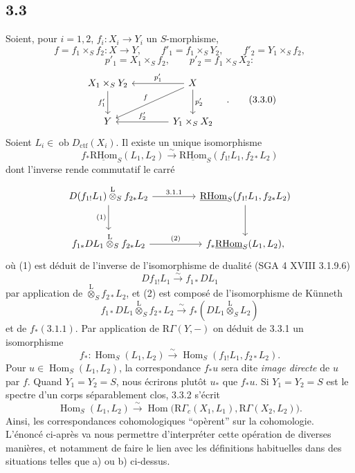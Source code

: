\documentclass[11pt]{article}
\DeclareMathOperator{\Hom}{Hom}
\newcommand{\R}{\mathrm{R}}\newcommand{\RHomCore}{\mathrm{RHom}}
\newcommand{\ob}{\operatorname{ob}}
\providecommand{\RHom}{\RHomCore}
\providecommand{\uRHom}{\underline{\RHom}}
\providecommand{\Dctf}{D_{\mathrm{ctf}}}
\providecommand{\Dctf}{D_{\mathrm{ctf}}}
\providecommand{\RHom}{\RHomCore}
\providecommand{\Hom}{\operatorname{Hom}}
\providecommand{\ob}{\operatorname{ob}}
\providecommand{\RHom}{\R\mathcal{H}om}
\providecommand{\R}{\mathrm R}
\providecommand{\RHom}{\RHomCore}
\providecommand{\Hom}{\operatorname{Hom}}
\begin{document}
\subsection*{3.3}
Soient, pour $i=1,2$, $f_i:X_i\to Y_i$ un $S$-morphisme,
\[
f=f_1\times_S f_2:X\to Y,
\qquad
f'_1=f_1\times_S Y_2,
\qquad
f'_2=Y_1\times_S f_2,
\]
\[
p'_1=X_1\times_S f_2,
\qquad
p'_2=f_1\times_S X_2:
\]
\begin{equation}
\begin{tikzcd}[column sep=3.8em,row sep=2.4em]
X_1\times_S Y_2 \arrow[d,"f'_1"'] & X \arrow[l,"p'_1"'] \arrow[dl,"f"'] \arrow[d,"p'_2"] \\
Y & Y_1\times_S X_2 \arrow[l,"f'_2"']
\end{tikzcd}\quad .
\tag{3.3.0}
\end{equation}
Soient $L_i\in\ob\Dctf(X_i)$. Il existe un unique isomorphisme
\begin{equation}
f_*\uRHom_S(L_1,L_2)
\xrightarrow{\sim}
\uRHom_S(f_{1!}L_1,f_{2*}L_2)
\tag{3.3.1}
\end{equation}
dont l'inverse rende commutatif le carré
\[
\begin{tikzcd}[column sep=4.5em,row sep=2.6em]
D(f_{1!}L_1)\overset{\mathrm{L}}{\otimes}_S f_{2*}L_2
  \arrow[r,"3.1.1"] \arrow[d,"(1)"']
& \uRHom_S(f_{1!}L_1,f_{2*}L_2) \arrow[d] \\
f_{1*}DL_1\overset{\mathrm{L}}{\otimes}_S f_{2*}L_2
  \arrow[r,"(2)"]
& f_*\uRHom_S(L_1,L_2),
\end{tikzcd}
\]
où (1) est
déduit de l'inverse de l'isomorphisme de dualité (SGA 4 XVIII 3.1.9.6)
\[
Df_{1!}L_1\xrightarrow{\sim}f_{1*}DL_1
\]
par application de $\overset{\mathrm{L}}{\otimes}_S f_{2*}L_2$, et (2) est composé de l'isomorphisme de Künneth
\[
f_{1*}DL_1\overset{\mathrm{L}}{\otimes}_S f_{2*}L_2
\xrightarrow{\sim}
f_*(DL_1\overset{\mathrm{L}}{\otimes}_S L_2)
\]
et de $f_*(3.1.1)$. Par application de $\R\Gamma(Y,-)$ on déduit de 3.3.1 un isomorphisme
\begin{equation}
f_*:\Hom_S(L_1,L_2)
\xrightarrow{\sim}
\Hom_S(f_{1!}L_1,f_{2*}L_2).
\tag{3.3.2}
\end{equation}
Pour $u\in\Hom_S(L_1,L_2)$, la correspondance $f_*u$ sera dite \emph{image directe} de $u$ par $f$. Quand $Y_1=Y_2=S$, nous écrirons plutôt $u_*$ que $f_*u$. Si $Y_1=Y_2=S$ est le spectre d'un corps séparablement clos, 3.3.2 s'écrit
\begin{equation}
\Hom_S(L_1,L_2)
\xrightarrow{\sim}
\Hom\bigl(\R\Gamma_c(X_1,L_1),\R\Gamma(X_2,L_2)\bigr).
\tag{3.3.3}
\end{equation}
Ainsi, les correspondances cohomologiques ``opèrent'' sur la cohomologie. L'énoncé ci-après va nous permettre d'interpréter cette opération de diverses manières, et notamment de faire le lien avec les définitions habituelles dans des situations telles que a) ou b) ci-dessus.
\end{document}
